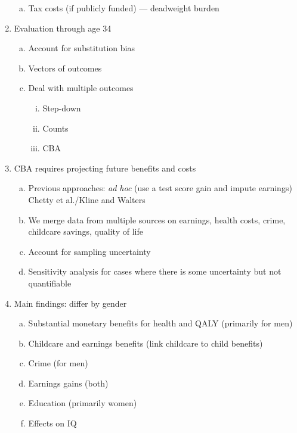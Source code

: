 \begin{enumerate}[(1)]
\begin{enumerate}[(a)]
    \item Tax costs (if publicly funded) --- deadweight burden
    \end{enumerate}
\item Evaluation through age 34
    \begin{enumerate}[(a)]
    \item Account for substitution bias
    \item Vectors of outcomes
    \item Deal with multiple outcomes
        \begin{enumerate}[(i)]
        \item Step-down
        \item Counts
        \item CBA
        \end{enumerate}
    \end{enumerate}
\item CBA requires projecting future benefits and costs
    \begin{enumerate}[(a)]
    \item Previous approaches: \emph{ad hoc} (use a test score gain and impute earnings) Chetty et al./Kline and Walters
    \item We merge data from multiple sources on earnings, health costs, crime, childcare savings, quality of life
    \item Account for sampling uncertainty
    \item Sensitivity analysis for cases where there is some uncertainty but not quantifiable
    \end{enumerate}
\item Main findings: differ by gender
    \begin{enumerate}[(a)]
    \item Substantial monetary benefits for health and QALY (primarily for men)
    \item Childcare and earnings benefits (link childcare to child benefits)
    \item Crime (for men)
    \item Earnings gains (both)
    \item Education (primarily women)
    \item Effects on IQ
    \end{enumerate}
\end{enumerate}

